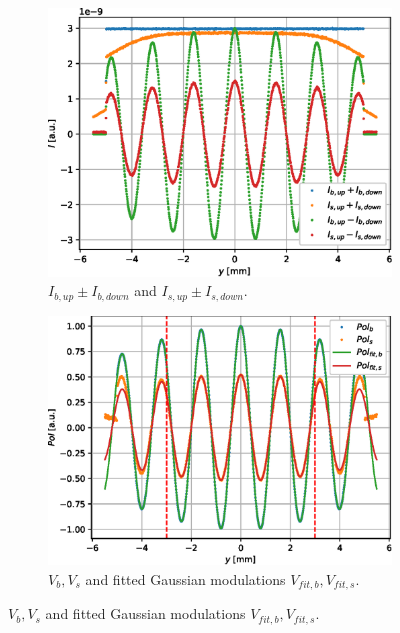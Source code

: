 \begin{figure}[htbp]
	\centering
	\begin{subfigure}[b]{0.45\textwidth}
		\centering
		\includegraphics[width=\textwidth]{simulation-raw-intensity-differential}
		\caption{$I_{b,up} \pm I_{b,down}$ and $I_{s,up} \pm I_{s,down}$.}
		\label{fig:simulation-raw-intensity-differential}
	\end{subfigure}
	\hfill
	\begin{subfigure}[b]{0.45\textwidth}
		\centering
		\includegraphics[width=\textwidth]{simulation-raw-intensity-pol}
		\caption{$V_b, V_s$ and fitted Gaussian modulations $V_{fit,b}, V_{fit,s}$.}
		\label{fig:simulation-raw-intensity-pol}
	\end{subfigure}

\end{figure}
